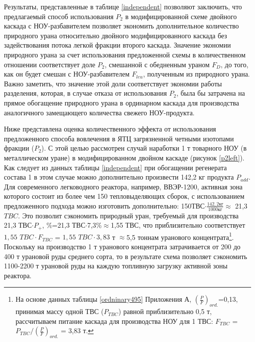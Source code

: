 Результаты, представленные в таблице \ref{independent} позволяют заключить, что предлагаемый способ использования $P_2$ в модифицированной схеме двойного каскада с НОУ-разбавителем позволяет экономить дополнительное количество природного урана относительно двойного модифицированного каскада без задействования потока легкой фракции второго каскада. Значение экономии природного урана за счет использования предложенной схемы в количественном отношении соответствует доле $P_2$, смешанной с обедненным ураном $F_D$, до того, как он будет смешан с НОУ-разбавителем $F_{leu}$, полученным из природного урана. Важно заметить, что значение этой доли соответствует экономии работы разделения, которая, в случае отказа от использования $P_2$, была бы затрачена на прямое обогащение природного урана в ординарном каскада для производства аналогичного замещающего количества свежего НОУ-продукта.

Ниже представлена оценка количественного эффекта от использования предложенного способа вовлечения в ЯТЦ загрязненной четными изотопами фракции ($P_2$). С этой целью рассмотрен случай наработки 1 т товарного НОУ (в металлическом уране) в модифицированном двойном каскаде (рисунок \ref{p2left}). Как следует из данных таблицы \ref{independent} при обогащении регенерата состава 1 в этом случае можно дополнительно произвести 142,2 кг продукта $P_{add}$. Для современного легководного реактора, например, ВВЭР-1200, активная зона которого состоит из более чем 150 тепловыделяющих сборок, с использованием предложенного подхода можно изготовить дополнительно: 150$ $ТВС$\cdot \frac{142,2 \textit{кг}}{1000 \textit{кг}}\approx$ 21,3 $TBC$. Это позволит сэкономить природный уран, требуемый для производства 21,3 ТВС$\cdot P_{+}$, \%=21,3 ТВС$\cdot$7,3\%$\approx$1,55 ТВС, что приблизительно соответствует $1,55$  $TBC \cdot F_{TBC}$ = $1,55$ $TBC\cdot 3,83$ т $\approx$5,5 тоннам уранового концентрата\footnote{На основе данных таблицы \ref{ordninary495} Приложения А, $(\frac{P}{F})_{ord.}$=0,13,  принимая массу одной ТВС ($P_{TBC}$) равной приблизительно 0,5 т, рассчитываем питание каскада для производства НОУ для 1 ТВС: $F_{TBC}$ = $P_{TBC}/(\frac{P}{F})_{ord.}$ = 3,83 т.}. Поскольку на производство 1 т уранового концентрата затрачивается от 200 до 400 т урановой руды \cite{bekmanYaDERNAYaFIZIKA} среднего сорта, то в результате схема позволяет сэкономить 1100-2200 т урановой руды на каждую топливную загрузку активной зоны реактора.


